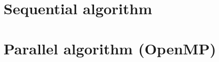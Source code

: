 \documentclass[10pt]{article}
\begin{document}
\maketitle

\section{Sequential algorithm}

\section{Parallel algorithm (OpenMP)}
\end{document}

